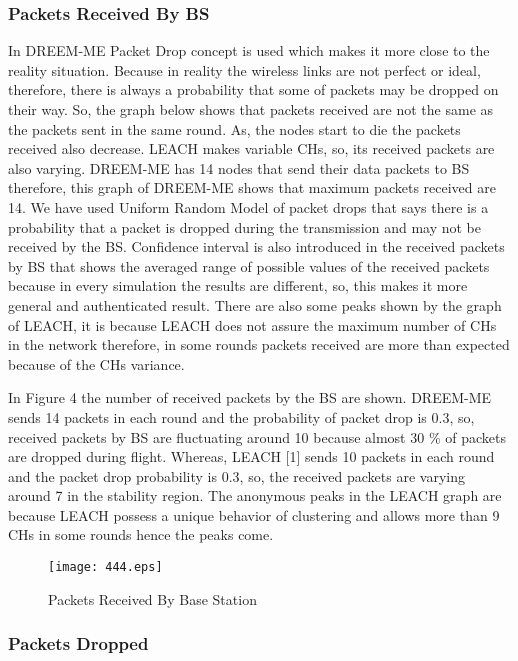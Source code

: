 \documentclass[journal]{IEEEtran}
\begin{document}
\subsubsection{Packets Received By BS }
In DREEM-ME Packet Drop concept is used which makes it more close to the reality situation. Because in reality the wireless links are not perfect or ideal, therefore, there is always a probability that some of packets may be dropped on their way. So, the graph below shows that packets received are not the same as the packets sent in the same round. As, the nodes start to die the packets received also decrease. LEACH makes variable CHs, so, its received packets are also varying. DREEM-ME has 14 nodes that send their data packets to BS therefore, this graph of DREEM-ME shows that maximum packets received are 14. We have used Uniform Random Model of packet drops that says there is a probability that a packet is dropped during the transmission and may not be received by the BS. Confidence interval is also introduced in the received packets by BS that shows the averaged range of possible values of the received packets because in every simulation the results are different, so, this makes it more general and authenticated result. There are also some peaks shown by the graph of LEACH, it is because LEACH does not assure the maximum number of CHs in the network therefore, in some rounds packets received are more than expected because of the CHs variance.

In Figure 4 the number of received packets by the BS are shown. DREEM-ME sends 14 packets in each round and the probability of packet drop is 0.3, so, received packets by BS are fluctuating around 10 because almost 30 \% of packets are dropped during flight. Whereas, LEACH [1] sends 10 packets in each round and the packet drop probability is 0.3, so, the received packets are varying around 7 in the stability region. The anonymous peaks in the LEACH graph are because LEACH possess a unique behavior of clustering and allows more than 9 CHs in some rounds hence the peaks come.

\begin{figure}[!h]
\centering
\texttt{[image: 444.eps]}
\caption{ Packets Received By Base Station }
\end{figure}

\subsubsection{ Packets Dropped }
\end{document}
